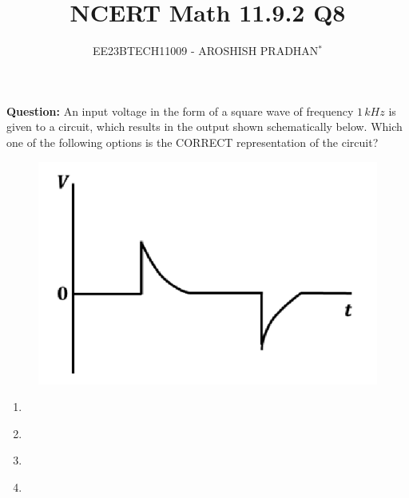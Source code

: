 \documentclass[journal,12pt,twocolumn]{IEEEtran}
\theoremstyle{remark}
\begin{document}

\vspace{3cm}

\title{NCERT Math 11.9.2 Q8}
\author{EE23BTECH11009 - AROSHISH PRADHAN$^{*}$%
}
\maketitle
\newpage
\bigskip
\textbf{Question:} An input voltage in the form of a square wave of frequency $1\, kHz$ is given to a circuit, which results in the output shown schematically below. Which one of the following options is the CORRECT representation of the circuit?

\begin{figure}[!h]
    \centering
    \includegraphics[width = 0.6\columnwidth]{figs/question.png}
    \caption{}
    \label{fig:ques_gate.ph.23.37}
\end{figure}

\begin{enumerate}[label = (\alph*)]
    \item 
    \begin{figure}[!h]
        \centering
        \resizebox{0.2\textwidth}{!}{}
        \label{optA_gate.ph.23.37}
    \end{figure}

    \item 
    \begin{figure}[!h]
        \centering
        \resizebox{0.2\textwidth}{!}{}
        \label{optB_gate.ph.23.37}
    \end{figure}

    \item 
    \begin{figure}[!h]
        \centering
        \resizebox{0.2\textwidth}{!}{}
        \label{optC_gate.ph.23.37}
    \end{figure}

    \item 
    \begin{figure}[!h]
        \centering
        \resizebox{0.2\textwidth}{!}{}
        \label{optD_gate.ph.23.37}
    \end{figure}
\end{enumerate}
\end{document}

